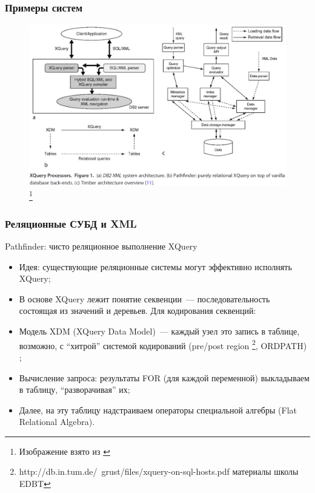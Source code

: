 \documentclass{beamer}
\begin{document}
\begin{frame}[t]
\frametitle{Примеры систем}

\begin{figure}[htb]
\includegraphics[width=\textwidth,height=0.77\textheight,keepaspectratio]{xml-approaches.png} 
\footnote{\tiny{Изображение взято из \cite{Grust2009}}}
\end{figure}    
  
\end{frame}

\begin{frame}
\frametitle{Реляционные СУБД и XML}
Pathfinder: чисто реляционное выполнение XQuery
\begin{itemize}
  \setlength\itemsep{1em}
  \item Идея: существующие реляционные системы могут эффективно исполнять XQuery;
  \item В основе XQuery лежит понятие секвенции~--- последовательность состоящая из значений и деревьев. Для кодирования секвенций:
  \item Модель XDM (XQuery Data Model)~--- каждый узел это запись в таблице, возможно, с ``хитрой'' системой кодирований (pre/post region \footnote{http://db.in.tum.de/~grust/files/xquery-on-sql-hosts.pdf материалы школы EDBT}, ORDPATH) \cite{Grust2009};
  \item Вычисление запроса: результаты FOR (для каждой переменной) выкладываем в таблицу, ``разворачивая'' их;
  \item Далее, на эту таблицу надстраиваем операторы специальной алгебры (Flat Relational Algebra).
\end{itemize}
\end{frame}
\end{document}

